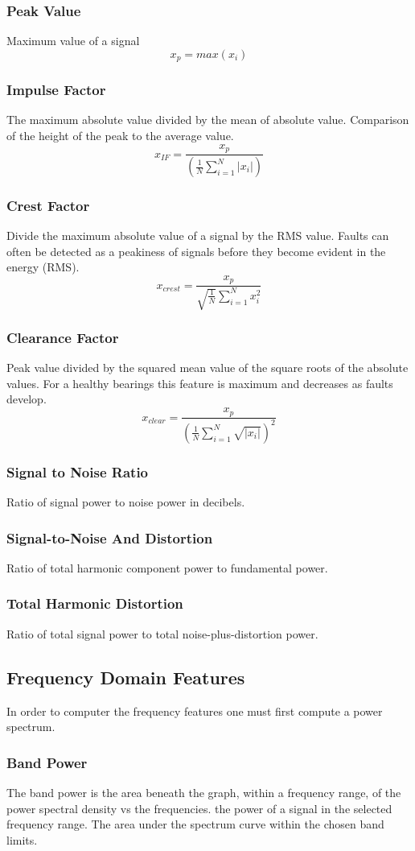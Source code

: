 \documentclass{article}
\begin{document}
\subsubsection{Peak Value}
Maximum value of a signal
$$ x_p = max(x_i) $$ 
\subsubsection{Impulse Factor} 
The maximum absolute value divided by the mean of absolute value. Comparison of the height of the peak to the average value.
$$ x_{IF} = \frac{x_p}{(\frac{1}{N}\sum^N_{i=1}|x_i|)} $$  
\subsubsection{Crest Factor} 
Divide the maximum absolute value of a signal by the RMS value.
Faults can often be detected as a peakiness of signals before they become evident in the energy (RMS).
$$ x_{crest} = \frac{x_p}{\sqrt{\frac{1}{N}}\sum^N_{i=1}x^2_i} $$
\subsubsection{Clearance Factor} 
Peak value divided by the squared mean value of the square roots of the absolute values. For a healthy bearings this feature is maximum and decreases as faults develop.
$$ x_{clear} = \frac{x_p}{(\frac{1}{N}\sum^N_{i=1}\sqrt{|x_i|})^2} $$
\subsubsection{Signal to Noise Ratio}
Ratio of signal power to noise power in decibels.
\subsubsection{Signal-to-Noise And Distortion}
Ratio of total harmonic component power to fundamental power.
\subsubsection{Total Harmonic Distortion}
Ratio of total signal power to total noise-plus-distortion power.

\subsection{Frequency Domain Features}
In order to computer the frequency features one must first compute a power spectrum.
\subsubsection{Band Power}
The band power is the area beneath the graph, within a frequency range, of the power spectral density vs the frequencies.
the power of a signal in the selected frequency range.
The area under the spectrum curve within the chosen band limits.
\end{document}
